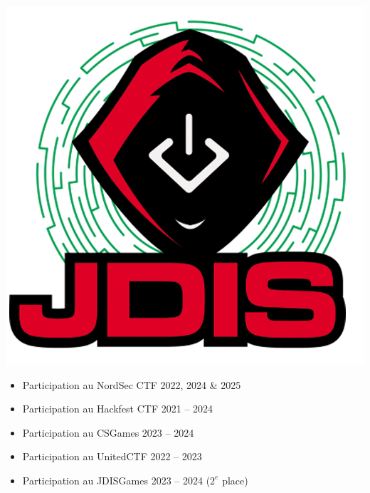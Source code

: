\documentclass[10pt,a4paper,withhyper]{altacv}
\begin{document}
\divider

\hfill\begin{minipage}{1.25cm}
    \includegraphics[width=\linewidth]{figures/jdis}
\end{minipage}
\vspace{-1.25cm}

\begin{itemize}
\item Participation au NordSec CTF 2022, 2024 \& 2025
\item Participation au Hackfest CTF 2021 -- 2024
\item Participation au CSGames 2023 -- 2024
\item Participation au UnitedCTF 2022 -- 2023
\item Participation au JDISGames 2023 -- 2024 ($2^e$ place)
\end{itemize}

\divider
\end{document}
